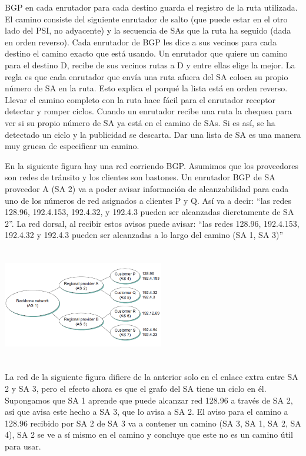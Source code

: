 	\par BGP en cada enrutador para cada destino guarda el registro de la ruta utilizada. El camino consiste del siguiente enrutador de salto (que puede estar en el otro lado del PSI, no adyacente) y la secuencia de SAs que la ruta ha seguido (dada en orden reverso). Cada enrutador de BGP les dice a sus vecinos para cada destino el camino exacto que está usando. Un enrutador que quiere un camino para el destino D, recibe de sus vecinos rutas a D y entre ellas elige la mejor. La regla es que cada enrutador que envía una ruta afuera del SA coloca su propio número de SA en la ruta. Esto explica el porqué la lista está en orden reverso. Llevar el camino completo con la ruta hace fácil para el enrutador receptor detectar y romper ciclos. Cuando un enrutador recibe una ruta la chequea para ver si su propio número de SA ya está en el camino de SAs. Si es así, se ha detectado un ciclo y la publicidad se descarta. Dar una lista de SA es una manera muy gruesa de especificar un camino.

	\par En la siguiente figura hay una red corriendo BGP. Asumimos que los proveedores son redes de tránsito y los clientes son bastones. Un enrutador BGP de SA proveedor A (SA 2) va a poder avisar información de alcanzabilidad para cada uno de los números de red asignados a clientes P y Q.  Así va a decir: “las redes 128.96, 192.4.153, 192.4.32, y 192.4.3 pueden ser alcanzadas dierctamente de SA 2”. La red dorsal, al recibir estos avisos puede avisar: “las redes 128.96, 192.4.153, 192.4.32 y 192.4.3 pueden ser alcanzadas a lo largo del camino (SA 1, SA 3)”

	\begin{center}
		\includegraphics[width=7cm, height=5cm]{./imagenes/fig1.png}
	\end{center}
	
	\par La red de la siguiente figura difiere de la anterior solo en el enlace extra entre SA 2 y SA 3, pero el efecto ahora es que el grafo del SA tiene un ciclo en él. Supongamos que SA 1 aprende que puede alcanzar red 128.96 a través de SA 2, así que avisa este hecho a SA 3, que lo avisa a SA 2. El aviso para el camino a 128.96 recibido por SA 2 de SA 3 va a contener un camino (SA 3, SA 1, SA 2, SA 4), SA 2 se ve a sí mismo en el camino y concluye que este no es un camino útil para usar.

